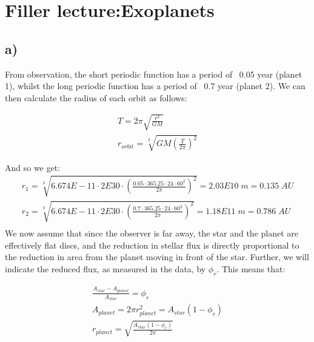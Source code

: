 \section{ Filler lecture:Exoplanets }\label{sec:q5}    


\subsection*{a)}
From observation, the short periodic function has a period of ~0.05 year (planet 1), whilst the long periodic function has a period of ~0.7 year (planet 2). We can then calculate the radius of each orbit as follows:

\begin{equation}
\begin{split}
    T = 2 \pi \sqrt{ \frac{r^3}{GM}} \\
    r_{orbit} = \sqrt[3]{GM \left(\frac{T}{2 \pi} \right)^2 }
\end{split}
\end{equation}

And so we get:
\begin{equation*}
\begin{split}
    r_1 = \sqrt[3]{6.674E-11 \cdot 2E30 \cdot \left(\frac{0.05\cdot365.25\cdot24\cdot60^2}{2 \pi} \right)^2 } = 2.03E10 \; m = 0.135 \; AU \\
    r_2 = \sqrt[3]{6.674E-11 \cdot 2E30 \cdot \left(\frac{0.7\cdot365.25\cdot24\cdot60^2}{2 \pi} \right)^2 } = 1.18E11 \; m = 0.786 \; AU \\
\end{split}
\end{equation*}
We now assume that since the observer is far away, the star and the planet are effectively flat discs, and the reduction in stellar flux is directly proportional to the reduction in area from the planet moving in front of the star. Further, we will indicate the reduced flux, as measured in the data, by $\phi_r$. This means that:

\begin{equation}
\begin{split}
    \frac{A_{star} - A_{planet}}{A_{star}} = \phi_r \\
    A_{planet} = 2 \pi r_{planet}^2 = A_{star} (1-\phi_r) \\
    r_{planet} = \sqrt{ \frac{A_{star} (1-\phi_r)}{2\pi}} \\
\end{split}
\end{equation}

